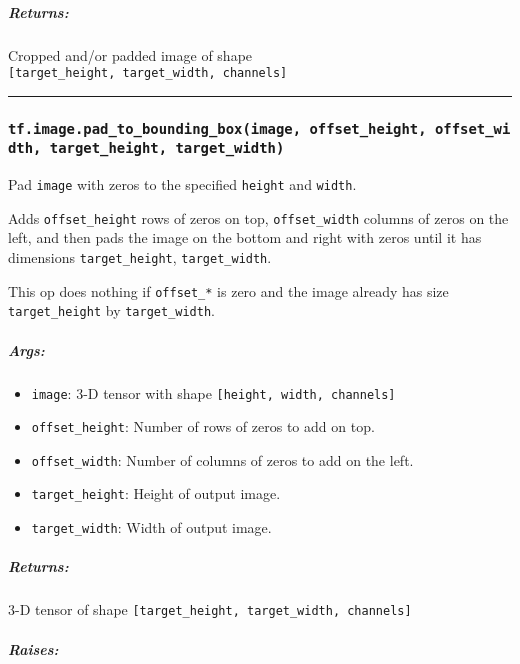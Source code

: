 \subparagraph{Returns: }\label{returns-9}

Cropped and/or padded image of shape
\texttt{{[}target\_height,\ target\_width,\ channels{]}}

\begin{center}\rule{0.5\linewidth}{\linethickness}\end{center}

\subsubsection{\texorpdfstring{\texttt{tf.image.pad\_to\_bounding\_box(image,\ offset\_height,\ offset\_width,\ target\_height,\ target\_width)}
}{tf.image.pad\_to\_bounding\_box(image, offset\_height, offset\_width, target\_height, target\_width) }}\label{tf.image.padux5ftoux5fboundingux5fboximage-offsetux5fheight-offsetux5fwidth-targetux5fheight-targetux5fwidth}

Pad \texttt{image} with zeros to the specified \texttt{height} and
\texttt{width}.

Adds \texttt{offset\_height} rows of zeros on top,
\texttt{offset\_width} columns of zeros on the left, and then pads the
image on the bottom and right with zeros until it has dimensions
\texttt{target\_height}, \texttt{target\_width}.

This op does nothing if \texttt{offset\_*} is zero and the image already
has size \texttt{target\_height} by \texttt{target\_width}.

\subparagraph{Args: }\label{args-10}

\begin{itemize}
\tightlist
\item
  \texttt{image}: 3-D tensor with shape
  \texttt{{[}height,\ width,\ channels{]}}
\item
  \texttt{offset\_height}: Number of rows of zeros to add on top.
\item
  \texttt{offset\_width}: Number of columns of zeros to add on the left.
\item
  \texttt{target\_height}: Height of output image.
\item
  \texttt{target\_width}: Width of output image.
\end{itemize}

\subparagraph{Returns: }\label{returns-10}

3-D tensor of shape
\texttt{{[}target\_height,\ target\_width,\ channels{]}}

\subparagraph{Raises: }\label{raises-2}

